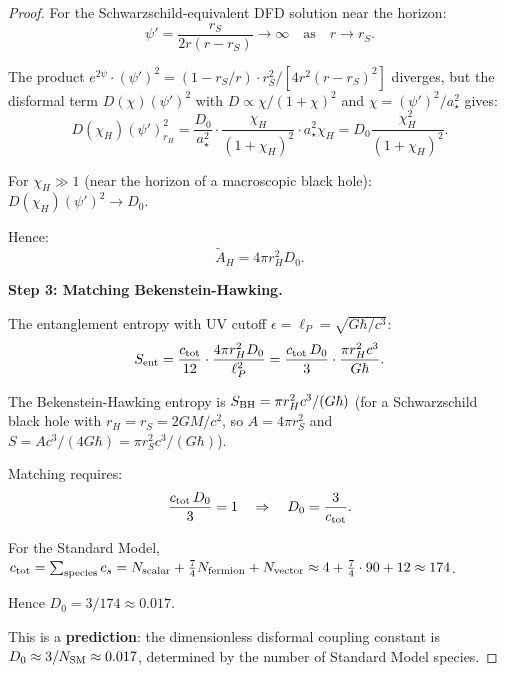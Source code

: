 \documentclass[11pt,a4paper]{article}
\begin{document}
\begin{proof}
For the Schwarzschild-equivalent DFD solution near the horizon:
\begin{equation}
\psi' = \frac{r_S}{2r(r-r_S)} \to \infty \quad\text{as}\quad r \to r_S.
\end{equation}

The product $e^{2\psi}\cdot(\psi')^2 = (1-r_S/r)\cdot r_S^2/[4r^2(r-r_S)^2]$ diverges, but the disformal term $D(\chi)(\psi')^2$ with $D \propto \chi/(1+\chi)^2$ and $\chi = (\psi')^2/a_\star^2$ gives:
\begin{equation}
D(\chi_H)(\psi')^2_{r_H} = \frac{D_0}{a_\star^2}\cdot\frac{\chi_H}{(1+\chi_H)^2}\cdot a_\star^2\chi_H = D_0\frac{\chi_H^2}{(1+\chi_H)^2}.
\end{equation}

For $\chi_H \gg 1$ (near the horizon of a macroscopic black hole): $D(\chi_H)(\psi')^2 \to D_0$.

Hence:
\begin{equation}
\tilde{A}_H = 4\pi r_H^2 D_0.
\end{equation}

\textbf{Step 3: Matching Bekenstein-Hawking.}

The entanglement entropy with UV cutoff $\epsilon = \ell_P = \sqrt{G\hbar/c^3}$:
\begin{equation}
S_{\rm ent} = \frac{c_{\rm tot}}{12}\cdot\frac{4\pi r_H^2 D_0}{\ell_P^2} = \frac{c_{\rm tot}\,D_0}{3}\cdot\frac{\pi r_H^2 c^3}{G\hbar}.
\end{equation}

The Bekenstein-Hawking entropy is $S_{\rm BH} = \pi r_H^2 c^3/(G\hbar)$ (for a Schwarzschild black hole with $r_H = r_S = 2GM/c^2$, so $A = 4\pi r_S^2$ and $S = A c^3/(4G\hbar) = \pi r_S^2 c^3/(G\hbar)$).

Matching requires:
\begin{equation}
\frac{c_{\rm tot}\,D_0}{3} = 1 \quad\Rightarrow\quad D_0 = \frac{3}{c_{\rm tot}}.
\end{equation}

For the Standard Model, $c_{\rm tot} = \sum_{\rm species} c_s = N_{\rm scalar} + \frac{7}{4}N_{\rm fermion} + N_{\rm vector} \approx 4 + \frac{7}{4}\cdot 90 + 12 \approx 174$.

Hence $D_0 = 3/174 \approx 0.017$.

This is a \textbf{prediction}: the dimensionless disformal coupling constant is $D_0 \approx 3/N_{\rm SM} \approx 0.017$, determined by the number of Standard Model species.
\end{proof}
\end{document}
